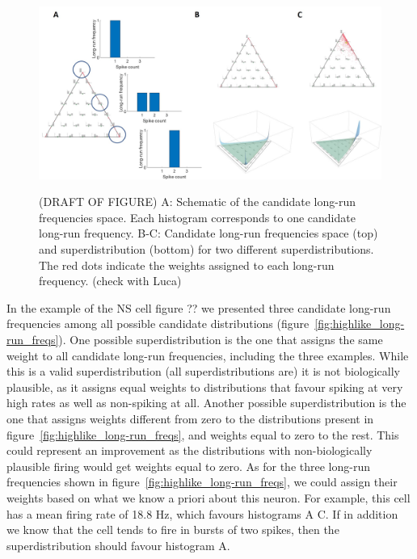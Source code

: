 \begin{figure}
	\centering
	\includegraphics[scale=0.35]{superdistribution.jpg}%
	\label{fig:schematic_superdistribution}
	\caption{(DRAFT OF FIGURE) A: Schematic of the candidate long-run frequencies space. Each histogram corresponds to one candidate long-run frequency. B-C: Candidate long-run frequencies space (top) and superdistribution (bottom) for two different superdistributions. The red dots indicate the weights assigned to each long-run frequency. (check with Luca)}
\end{figure}


In the example of the NS cell figure ?? we presented three candidate long-run frequencies among all possible candidate distributions (figure~\ref{fig:highlike_long-run_freqs}). One possible superdistribution is the one that assigns the same weight to all candidate long-run frequencies, including the three examples. While this is a valid superdistribution (all superdistributions are) it is not biologically plausible, as it assigns equal weights to distributions that favour spiking at very high rates as well as non-spiking at all. Another possible superdistribution is the one that assigns weights different from zero to the distributions present in figure~\ref{fig:highlike_long-run_freqs}, and weights equal to zero to the rest. This could represent an improvement as the distributions with non-biologically plausible firing would get weights equal to zero. As for the three long-run frequencies shown in figure~\ref{fig:highlike_long-run_freqs}, we could assign their weights based on what we know a priori about this neuron. For example, this cell has a mean firing rate of 18.8 Hz, which favours histograms A C. If in addition we know that the cell tends to fire in bursts of two spikes, then the superdistribution should favour histogram A.  

